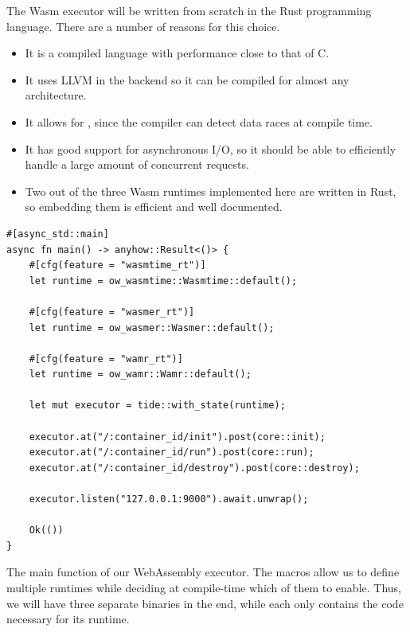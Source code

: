 The Wasm executor will be written from scratch in the Rust programming language. There are a number of reasons for this choice.

\begin{itemize}
    \item It is a compiled language with performance close to that of C.
    \item It uses LLVM in the backend so it can be compiled for almost any architecture.
    \item It allows for , since the compiler can detect data races at compile time.
    \item It has good support for asynchronous I/O, so it should be able to efficiently handle a large amount of concurrent requests.
    \item Two out of the three Wasm runtimes implemented here are written in Rust, so embedding them is efficient and well documented.
\end{itemize}

\begin{listing}[ht]
    \begin{verbatim}
#[async_std::main]
async fn main() -> anyhow::Result<()> {
    #[cfg(feature = "wasmtime_rt")]
    let runtime = ow_wasmtime::Wasmtime::default();

    #[cfg(feature = "wasmer_rt")]
    let runtime = ow_wasmer::Wasmer::default();

    #[cfg(feature = "wamr_rt")]
    let runtime = ow_wamr::Wamr::default();

    let mut executor = tide::with_state(runtime);

    executor.at("/:container_id/init").post(core::init);
    executor.at("/:container_id/run").post(core::run);
    executor.at("/:container_id/destroy").post(core::destroy);

    executor.listen("127.0.0.1:9000").await.unwrap();

    Ok(())
}
\end{verbatim}
    \caption{The main function of our WebAssembly executor. The \inl{\#[cfg(feature = "...")]} macros allow us to define multiple runtimes while deciding at compile-time which of them to enable. Thus, we will have three separate binaries in the end, while each only contains the code necessary for its runtime.}
    \label{listing:wasm-executor-main}
\end{listing}

